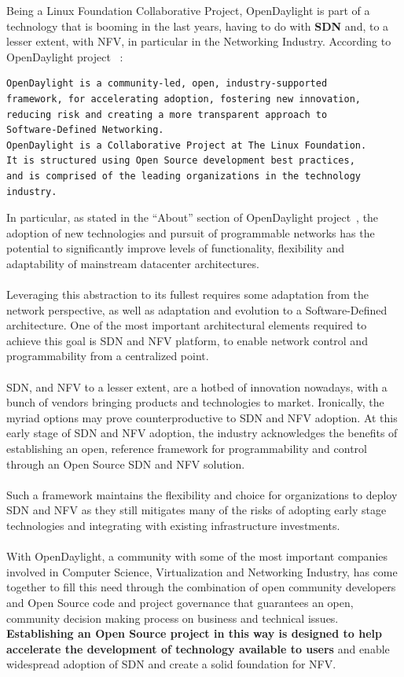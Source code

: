 \documentclass[a4paper, 12pt]{book}
\begin{document}
Being a Linux Foundation Collaborative Project, OpenDaylight is part of a technology that is booming in the last years, having to do with \textbf{SDN} and, to a lesser extent, with NFV, in particular in the Networking Industry. According to OpenDaylight project ~\cite{OpenDaylightTheProject}:
\begin{verbatim}
OpenDaylight is a community-led, open, industry-supported
framework, for accelerating adoption, fostering new innovation,
reducing risk and creating a more transparent approach to
Software-Defined Networking.
OpenDaylight is a Collaborative Project at The Linux Foundation.
It is structured using Open Source development best practices,
and is comprised of the leading organizations in the technology
industry.
\end{verbatim}
In particular, as stated in the ``About'' section of OpenDaylight project~\cite{OpenDaylightAbout}, the adoption of new technologies and pursuit of programmable networks has the potential to significantly improve levels of functionality, flexibility and adaptability of mainstream datacenter architectures.\\
\\
Leveraging this abstraction to its fullest requires some adaptation from the network perspective, as well as adaptation and evolution to a Software-Defined architecture. One of the most important architectural elements required to achieve this goal is SDN and NFV platform, to enable network control and programmability from a centralized point.\\
\\
SDN, and NFV to a lesser extent, are a hotbed of innovation nowadays, with a bunch of vendors bringing products and technologies to market. Ironically, the myriad options may prove counterproductive to SDN and NFV adoption. At this early stage of SDN and NFV adoption, the industry acknowledges the benefits of establishing an open, reference framework for programmability and control through an Open Source SDN and NFV solution.\\
\\
Such a framework maintains the flexibility and choice for organizations to deploy SDN and NFV as they still mitigates many of the risks of adopting early stage technologies and integrating with existing infrastructure investments.\\
\\
With OpenDaylight, a community with some of the most important companies involved in Computer Science, Virtualization and Networking Industry, has come together to fill this need through the combination of open community developers and Open Source code and project governance that guarantees an open, community decision making process on business and technical issues. \textbf{Establishing an Open Source project in this way is designed to help accelerate the development of technology available to users} and enable widespread adoption of SDN and create a solid foundation for NFV.\\
\end{document}

